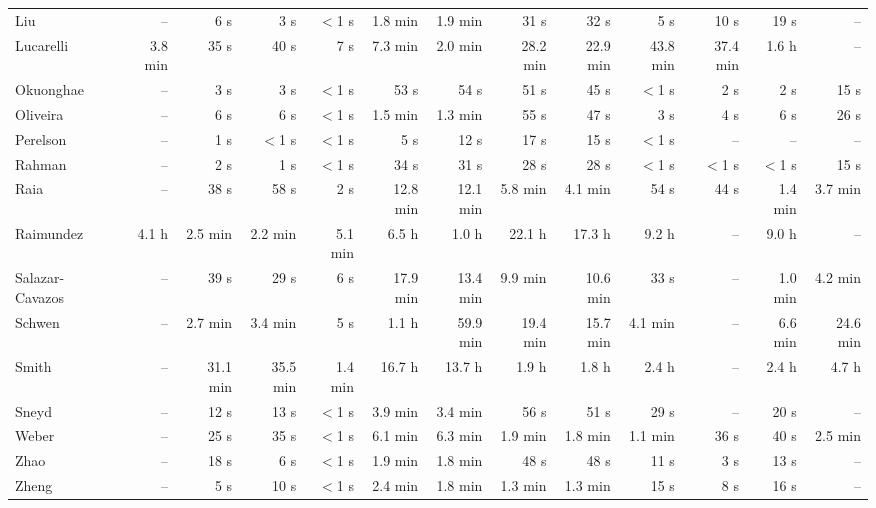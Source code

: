 \begin{longtable}{@{}lrrrrrrrrrrrr@{}}
Liu & -- & 6 s & 3 s & $<$1 s & 1.8 min & 1.9 min & 31 s & 32 s & 5 s & 10 s & 19 s & -- \\
Lucarelli & 3.8 min & 35 s & 40 s & 7 s & 7.3 min & 2.0 min & 28.2 min & 22.9 min & 43.8 min & 37.4 min & 1.6 h & -- \\
Okuonghae & -- & 3 s & 3 s & $<$1 s & 53 s & 54 s & 51 s & 45 s & $<$1 s & 2 s & 2 s & 15 s \\
Oliveira & -- & 6 s & 6 s & $<$1 s & 1.5 min & 1.3 min & 55 s & 47 s & 3 s & 4 s & 6 s & 26 s \\
Perelson & -- & 1 s & $<$1 s & $<$1 s & 5 s & 12 s & 17 s & 15 s & $<$1 s & -- & -- & -- \\
Rahman & -- & 2 s & 1 s & $<$1 s & 34 s & 31 s & 28 s & 28 s & $<$1 s & $<$1 s & $<$1 s & 15 s \\
Raia & -- & 38 s & 58 s & 2 s & 12.8 min & 12.1 min & 5.8 min & 4.1 min & 54 s & 44 s & 1.4 min & 3.7 min \\
Raimundez & 4.1 h & 2.5 min & 2.2 min & 5.1 min & 6.5 h & 1.0 h & 22.1 h & 17.3 h & 9.2 h & -- & 9.0 h & -- \\
Salazar-Cavazos & -- & 39 s & 29 s & 6 s & 17.9 min & 13.4 min & 9.9 min & 10.6 min & 33 s & -- & 1.0 min & 4.2 min \\
Schwen & -- & 2.7 min & 3.4 min & 5 s & 1.1 h & 59.9 min & 19.4 min & 15.7 min & 4.1 min & -- & 6.6 min & 24.6 min \\
Smith & -- & 31.1 min & 35.5 min & 1.4 min & 16.7 h & 13.7 h & 1.9 h & 1.8 h & 2.4 h & -- & 2.4 h & 4.7 h \\
Sneyd & -- & 12 s & 13 s & $<$1 s & 3.9 min & 3.4 min & 56 s & 51 s & 29 s & -- & 20 s & -- \\
Weber & -- & 25 s & 35 s & $<$1 s & 6.1 min & 6.3 min & 1.9 min & 1.8 min & 1.1 min & 36 s & 40 s & 2.5 min \\
Zhao & -- & 18 s & 6 s & $<$1 s & 1.9 min & 1.8 min & 48 s & 48 s & 11 s & 3 s & 13 s & -- \\
Zheng & -- & 5 s & 10 s & $<$1 s & 2.4 min & 1.8 min & 1.3 min & 1.3 min & 15 s & 8 s & 16 s & -- \\
\bottomrule
\end{longtable}
